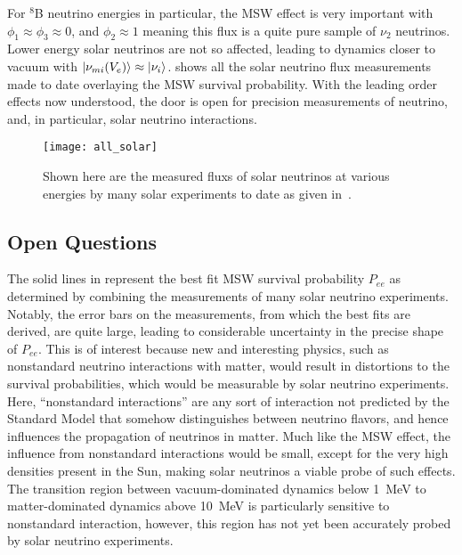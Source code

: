 For $^8$B neutrino energies in particular, the MSW effect is very important with $\phi_1 \approx \phi_3 \approx 0$, and $\phi_2 \approx 1$ meaning this flux is a quite pure sample of $\nu_2$ neutrinos. 
Lower energy solar neutrinos are not so affected, leading to dynamics closer to vacuum with $\ket{\nu_{mi}(V_e)} \approx \ket{\nu_i}$.
 shows all the solar neutrino flux measurements made to date overlaying the MSW survival probability.
With the leading order effects now understood, the door is open for precision measurements of neutrino, and, in particular, solar neutrino interactions.

\begin{figure}
\centering
\texttt{[image: all\_solar]}
\caption{\label{fig:global_solar}Shown here are the measured fluxs of solar neutrinos at various energies by many solar experiments to date as given in~\cite{nonstandard_interactions}.}
\end{figure}

\subsection{Open Questions}
The solid lines in  represent the best fit MSW survival probability $P_{ee}$ as determined by combining the measurements of many solar neutrino experiments.
Notably, the error bars on the measurements, from which the best fits are derived, are quite large, leading to considerable uncertainty in the precise shape of $P_{ee}$.
This is of interest because new and interesting physics, such as nonstandard neutrino interactions with matter, would result in distortions to the survival probabilities, which would be measurable by solar neutrino experiments.
Here, ``nonstandard interactions'' are any sort of interaction not predicted by the Standard Model that somehow distinguishes between neutrino flavors, and hence influences the propagation of neutrinos in matter.
Much like the MSW effect, the influence from nonstandard interactions would be small, except for the very high densities present in the Sun, making solar neutrinos a viable probe of such effects.
The transition region between vacuum-dominated dynamics below 1~MeV to matter-dominated dynamics above 10~MeV is particularly sensitive to nonstandard interaction, however, this region has not yet been accurately probed by solar neutrino experiments.

